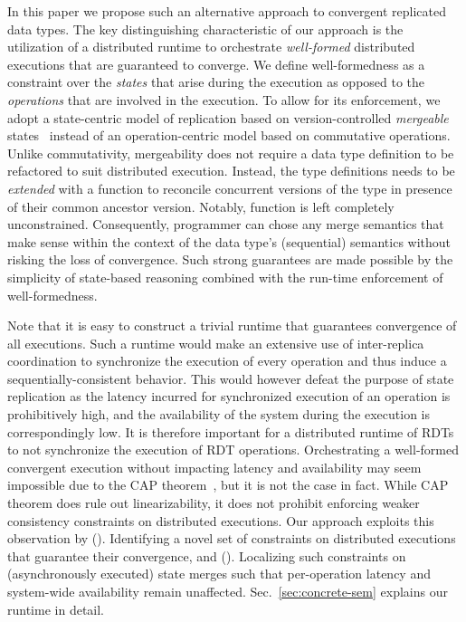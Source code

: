 In this paper we propose such an alternative approach to convergent
replicated data types. The key distinguishing characteristic of our
approach is the utilization of a distributed runtime to orchestrate
\emph{well-formed} distributed executions that are guaranteed to
converge. We define well-formedness as a constraint over the
\emph{states} that arise during the execution as opposed to the
\emph{operations} that are involved in the execution. To allow for its
enforcement, we adopt a state-centric model of replication based on
version-controlled \emph{mergeable} states~\cite{mrdt} instead of an
operation-centric model based on commutative operations. Unlike
commutativity, mergeability does not require a data type definition to
be refactored to suit distributed execution. Instead, the type
definitions needs to be \emph{extended} with a  function to
reconcile concurrent versions of the type in presence of their common
ancestor version. Notably,  function is left completely
unconstrained. Consequently, programmer can chose any merge semantics
that make sense within the context of the data type's (sequential)
semantics without risking the loss of convergence. Such strong
guarantees are made possible by the simplicity of state-based
reasoning combined with the run-time enforcement of well-formedness. 


Note that it is easy to construct a trivial runtime that guarantees
convergence of all executions.  Such a runtime would make an extensive
use of inter-replica coordination to synchronize the execution of
every operation and thus induce a sequentially-consistent behavior.
This would however defeat the purpose of state replication as the
latency incurred for synchronized execution of an operation is
prohibitively high, and the availability of the system during the
execution is correspondingly low. It is therefore important for a
distributed runtime of RDTs to not synchronize the execution of RDT
operations. Orchestrating a well-formed convergent execution without
impacting latency and availability may seem impossible due to the CAP
theorem~\cite{cap}, but it is not the case in fact. While CAP theorem
does rule out linearizability, it does not prohibit enforcing weaker
consistency constraints on distributed executions. Our approach
exploits this observation by (). Identifying a novel set of
constraints on distributed executions that guarantee their
convergence, and (). Localizing such constraints on
(asynchronously executed) state merges such that per-operation latency
and system-wide availability remain unaffected.
Sec.~\ref{sec:concrete-sem} explains our runtime in detail.

